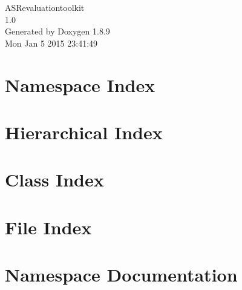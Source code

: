 \documentclass[twoside]{book}
\newcommand{\+}{\discretionary{\mbox{\scriptsize$\hookleftarrow$}}{}{}}
\newcommand{\clearemptydoublepage}{%
  \newpage{\pagestyle{empty}\cleardoublepage}%
}
\begin{document}
\begin{titlepage}
\vspace*{7cm}
\begin{center}%
{\Large A\+S\+Revaluationtoolkit \\[1ex]\large 1.\+0 }\\
\vspace*{1cm}
{\large Generated by Doxygen 1.8.9}\\
\vspace*{0.5cm}
{\small Mon Jan 5 2015 23:41:49}\\
\end{center}
\end{titlepage}
\clearemptydoublepage
\tableofcontents
\clearemptydoublepage
{}

\chapter{Namespace Index}

\chapter{Hierarchical Index}

\chapter{Class Index}

\chapter{File Index}

\chapter{Namespace Documentation}








\end{document}
